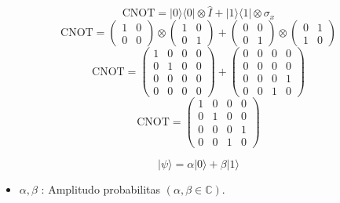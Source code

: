 \begin{equation}
    \text{CNOT} = |0\rangle\langle 0| \otimes \hat{I} + |1\rangle\langle 1| \otimes \sigma_x
\end{equation}
\begin{equation}
    \text{CNOT} = \begin{pmatrix} 1 & 0 \\ 0 & 0 \end{pmatrix} \otimes \begin{pmatrix} 1 & 0 \\ 0 & 1 \end{pmatrix} + \begin{pmatrix} 0 & 0 \\ 0 & 1 \end{pmatrix} \otimes \begin{pmatrix} 0 & 1 \\ 1 & 0 \end{pmatrix}
\end{equation}
\begin{equation}
    \text{CNOT} = \begin{pmatrix} 1 & 0 & 0 & 0 \\ 0 & 1 & 0 & 0 \\ 0 & 0 & 0 & 0 \\ 0 & 0 & 0 & 0 \end{pmatrix} + \begin{pmatrix} 0 & 0 & 0 & 0 \\ 0 & 0 & 0 & 0 \\ 0 & 0 & 0 & 1 \\ 0 & 0 & 1 & 0 \end{pmatrix}
\end{equation}
\begin{equation}
    \text{CNOT} = \begin{pmatrix} 1 & 0 & 0 & 0 \\ 0 & 1 & 0 & 0 \\ 0 & 0 & 0 & 1 \\ 0 & 0 & 1 & 0 \end{pmatrix}
\end{equation}

\begin{equation}
    |\psi\rangle = \alpha |0\rangle + \beta |1\rangle
\end{equation}
\begin{itemize}
    \item $\alpha, \beta$ : Amplitudo probabilitas $(\alpha, \beta \in \mathbb{C})$.
\end{itemize}

